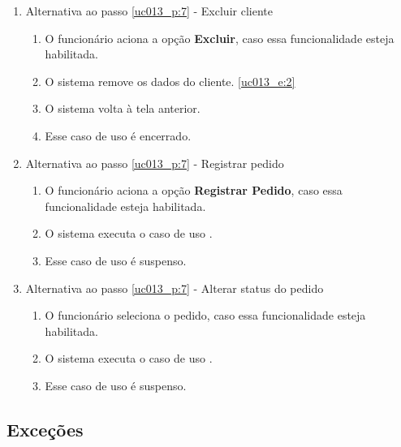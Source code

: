 \begin{enumerate}[label=A\arabic*]
	\item Alternativa ao passo \ref{uc013_p:7} - Excluir cliente \label{uc013_a:6}
	\begin{enumerate}[label*=.\arabic*]
		\item O funcionário aciona a opção \textbf{Excluir}, caso essa funcionalidade esteja habilitada.
		\item O sistema remove os dados do cliente. \label{uc013_a:6:2}\ref{uc013_e:2}
		\item O sistema volta à tela anterior.
		\item Esse caso de uso é encerrado.
	\end{enumerate}

	\item Alternativa ao passo \ref{uc013_p:7} - Registrar pedido \label{uc013_a:7}
	\begin{enumerate}[label*=.\arabic*]
		\item O funcionário aciona a opção \textbf{Registrar Pedido}, caso essa funcionalidade esteja habilitada.
		\item O sistema executa o caso de uso .
		\item Esse caso de uso é suspenso.
	\end{enumerate}
	
	\item Alternativa ao passo \ref{uc013_p:7} - Alterar status do pedido \label{uc013_a:8}
	\begin{enumerate}[label*=.\arabic*]
		\item O funcionário seleciona o pedido, caso essa funcionalidade esteja habilitada.
		\item O sistema executa o caso de uso .
		\item Esse caso de uso é suspenso.
	\end{enumerate}
\end{enumerate}

\subsection{Exceções}

